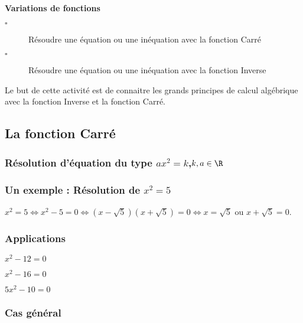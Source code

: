 \begin{titreTice}

\end{titreTice}


\begin{CpsCol}
\textbf{Variations de fonctions}
\begin{description}
\item[$\square$] Résoudre une équation ou une inéquation avec la fonction Carré
\item[$\square$] Résoudre une équation ou une inéquation avec la fonction Inverse
\end{description}
\end{CpsCol}


Le but de cette activité est de connaitre les grands principes de calcul algébrique avec la fonction Inverse et la fonction Carré. 
\subsection*{La fonction Carré}

\subsubsection*{Résolution d'équation du type $ax^2=k$,$k,a \in \R$}

\subsubsection*{Un exemple : Résolution de $x^2=5$}
$x^2=5 \Longleftrightarrow x^2-5 = 0 \Longleftrightarrow \left(x-\sqrt{5} \right)\left(x+\sqrt{5} \right) = 0 \Longleftrightarrow x=\sqrt{5}$ ou $x+\sqrt{5} =0$. 
\subsubsection*{Applications}
\begin{list}{•}{}
\item $x^2-12 = 0$
\item $x^2-16 = 0$
\item $5x^2-10 = 0$
\end{list}


\subsubsection*{Cas général}

